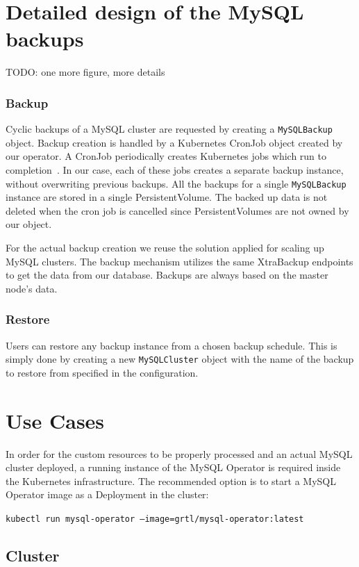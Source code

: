 \section{Detailed design of the MySQL backups}

TODO: one more figure, more details

\subsubsection*{Backup}
Cyclic backups of a MySQL cluster are requested by creating a \texttt{MySQLBackup} object. Backup creation is
handled by a Kubernetes CronJob object created by our operator. A CronJob periodically creates
Kubernetes jobs which run to completion~\cite{kube-comp}. In our case, each of these jobs creates a
separate backup instance, without overwriting previous backups. All the backups for a single
\texttt{MySQLBackup} instance are stored in a single PersistentVolume. The backed up data is not deleted when
the cron job is cancelled since PersistentVolumes are not owned by our object.

For the actual backup creation we reuse the solution applied for scaling up MySQL clusters. The
backup mechanism utilizes the same XtraBackup endpoints to get the data from our database. Backups
are always based on the master node’s data.

\subsubsection*{Restore}
Users can restore any backup instance from a chosen backup schedule. This is simply done by creating
a new \texttt{MySQLCluster} object with the name of the backup to restore from specified in the
configuration.

\section{Use Cases}
In order for the custom resources to be properly processed and an actual MySQL cluster deployed, a
running instance of the MySQL Operator is required inside the Kubernetes infrastructure. The
recommended option is to start a MySQL Operator image as a Deployment in the cluster:

\texttt{kubectl run mysql-operator --image=grtl/mysql-operator:latest}

\subsection{Cluster}
